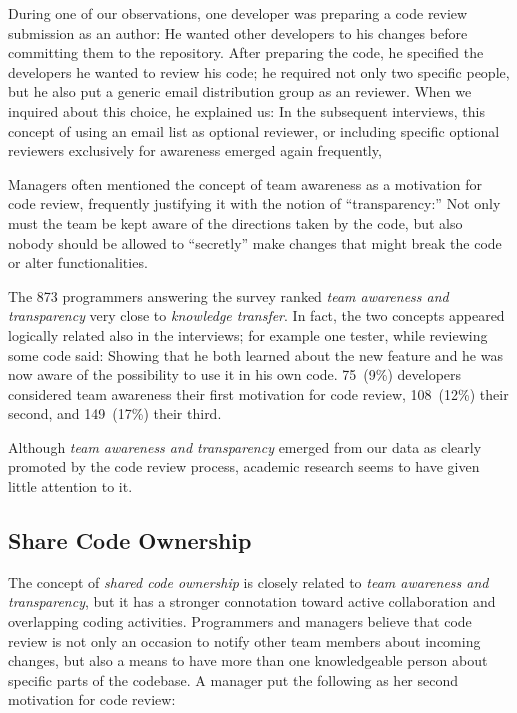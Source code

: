 During one of our observations, one developer was preparing a code review
submission as an author: He wanted other developers to 
his changes before committing them to the repository. After preparing the code,
he specified the developers he wanted to review his code; he required not only
two specific people, but he also put a generic email distribution group as an
 reviewer. When we inquired about this choice, he explained
us:  In the subsequent
interviews, this concept of using an email list as optional reviewer, or
including specific optional reviewers exclusively for awareness emerged again
frequently, \eg {}

Managers often mentioned the concept of team awareness as a motivation for code
review, frequently justifying it with the notion of ``transparency:'' Not only
must the team be kept aware of the directions taken by the code, but also
nobody should be allowed to ``secretly'' make changes that might break the code
or alter functionalities.

The 873 programmers answering the survey ranked \emph{team awareness and
transparency} very close to \emph{knowledge transfer}. In fact, the two concepts
appeared logically related also in the interviews; for example one tester,
while reviewing some code said:  Showing that he both
learned about the new feature and he was now aware of the possibility to use it
in his own code. 75~(9\%) developers considered team awareness their first
motivation for code review, 108~(12\%) their second, and 149~(17\%) their
third. 

Although \emph{team awareness and transparency} emerged from our data as clearly
promoted by the code review process, academic research seems to have given
little attention to it. 

\subsection{Share Code Ownership}

The concept of \emph{shared code ownership} is closely related to \emph{team awareness
and transparency}, but it has a stronger connotation toward active
collaboration and overlapping coding activities. Programmers and managers
believe that code review is not only an occasion to notify other team members
about incoming changes, but also a means to have more than one knowledgeable
person about specific parts of the codebase. A manager put the following as her
second motivation for code review: 

